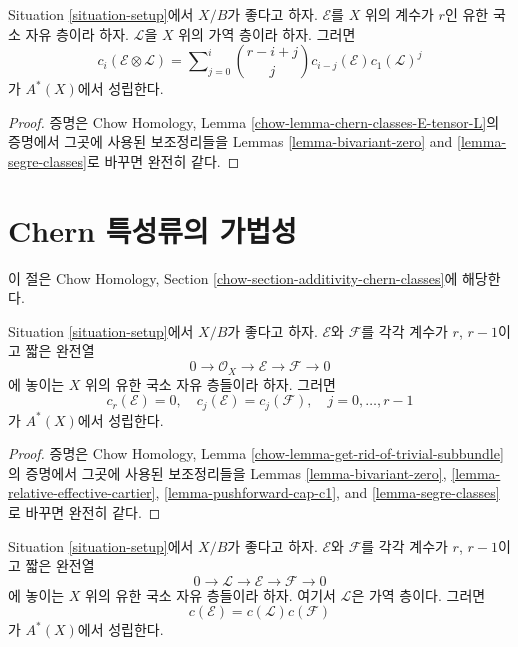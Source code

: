 \begin{lemma}
\label{lemma-chern-classes-E-tensor-L}
Situation \ref{situation-setup}에서 $X/B$가 좋다고 하자.
$\mathcal{E}$를 $X$ 위의 계수가 $r$인 유한 국소 자유 층이라 하자.
$\mathcal{L}$을 $X$ 위의 가역 층이라 하자. 그러면
\begin{equation}
\label{equation-twist}
c_i({\mathcal E} \otimes {\mathcal L})
=
\sum\nolimits_{j = 0}^i
\binom{r - i + j}{j} c_{i - j}({\mathcal E}) c_1({\mathcal L})^j
\end{equation}
가 $A^*(X)$에서 성립한다.
\end{lemma}

\begin{proof}
증명은 Chow Homology, Lemma
\ref{chow-lemma-chern-classes-E-tensor-L}의 증명에서 그곳에 사용된
보조정리들을 Lemmas \ref{lemma-bivariant-zero} and
\ref{lemma-segre-classes}로 바꾸면 완전히 같다.
\end{proof}

\section{Chern 특성류의 가법성}
\label{section-additivity-chern-classes}

\noindent
이 절은 Chow Homology, Section
\ref{chow-section-additivity-chern-classes}에 해당한다.

\begin{lemma}
\label{lemma-get-rid-of-trivial-subbundle}
Situation \ref{situation-setup}에서 $X/B$가 좋다고 하자.
$\mathcal{E}$와 $\mathcal{F}$를 각각 계수가 $r$, $r - 1$이고
짧은 완전열
$$
0 \to \mathcal{O}_X \to \mathcal{E} \to \mathcal{F} \to 0
$$
에 놓이는 $X$ 위의 유한 국소 자유 층들이라 하자. 그러면
$$
c_r(\mathcal{E}) = 0, \quad
c_j(\mathcal{E}) = c_j(\mathcal{F}), \quad j = 0, \ldots, r - 1
$$
가 $A^*(X)$에서 성립한다.
\end{lemma}

\begin{proof}
증명은 Chow Homology, Lemma
\ref{chow-lemma-get-rid-of-trivial-subbundle}의 증명에서 그곳에
사용된 보조정리들을 Lemmas
\ref{lemma-bivariant-zero},
\ref{lemma-relative-effective-cartier},
\ref{lemma-pushforward-cap-c1}, and
\ref{lemma-segre-classes}로 바꾸면 완전히 같다.
\end{proof}

\begin{lemma}
\label{lemma-additivity-invertible-subsheaf}
Situation \ref{situation-setup}에서 $X/B$가 좋다고 하자.
$\mathcal{E}$와 $\mathcal{F}$를 각각 계수가 $r$, $r - 1$이고
짧은 완전열
$$
0 \to \mathcal{L} \to \mathcal{E} \to \mathcal{F} \to 0
$$
에 놓이는 $X$ 위의 유한 국소 자유 층들이라 하자.
여기서 $\mathcal{L}$은 가역 층이다. 그러면
$$
c(\mathcal{E}) = c(\mathcal{L}) c(\mathcal{F})
$$
가 $A^*(X)$에서 성립한다.
\end{lemma}

